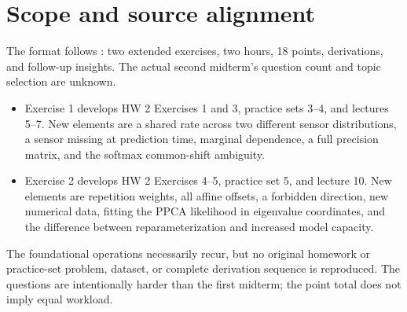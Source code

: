 \documentclass[11pt,a4paper]{article}
\begin{document}
\section*{Scope and source alignment}
The format follows : two extended
exercises, two hours, 18 points, derivations, and follow-up insights. The
actual second midterm's question count and topic selection are unknown.
\begin{itemize}
  \item Exercise 1 develops HW 2 Exercises 1 and 3, practice sets 3--4, and lectures 5--7. New elements are a shared rate across two different sensor distributions, a sensor missing at prediction time, marginal dependence, a full precision matrix, and the softmax common-shift ambiguity.
  \item Exercise 2 develops HW 2 Exercises 4--5, practice set 5, and lecture 10. New elements are repetition weights, all affine offsets, a forbidden direction, new numerical data, fitting the PPCA likelihood in eigenvalue coordinates, and the difference between reparameterization and increased model capacity.
\end{itemize}
The foundational operations necessarily recur, but no original homework or
practice-set problem, dataset, or complete derivation sequence is reproduced.
The questions are intentionally harder than the first midterm; the point total
does not imply equal workload.
\end{document}
